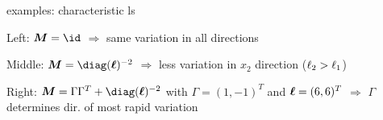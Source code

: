 \documentclass[11pt,compress,t,notes=noshow, xcolor=table]{beamer}
\begin{document}
\begin{framei}{examples: characteristic ls}



\item Left: $\bm{M} = \id$ $\Rightarrow$ same variation in all directions
\item Middle: $\bm{M} = \diag(\bm{\ls})^{-2}$ $\Rightarrow$ less variation in $x_2$ direction ($\ell_2 > \ell_1$)
\item Right: $\bm{M} = \Gamma \Gamma^T + \diag(\bm{\ls})^{-2}$ with $\Gamma = (1, -1)^T$ and $\bm{\ell} = (6, 6)^T$ $\Rightarrow$ $\Gamma$ determines dir. of most rapid variation
\vfill
{}

\end{framei}

\endlecture
\end{document}
